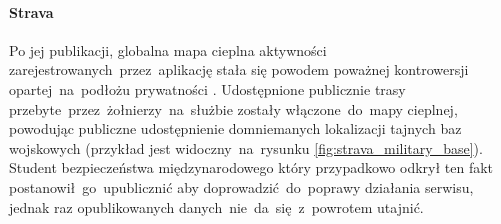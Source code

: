 \paragraph{Strava}
Po jej publikacji, globalna mapa cieplna aktywności zarejestrowanych~przez~aplikację  stała się powodem poważnej kontrowersji opartej~na~podłożu prywatności \cite{Strava_Military_Bases}. Udostępnione publicznie trasy przebyte~przez~żołnierzy~na~służbie zostały włączone~do~mapy cieplnej, powodując publiczne udostępnienie domniemanych lokalizacji tajnych baz wojskowych (przykład jest widoczny~na~rysunku \ref{fig:strava_military_base}). Student bezpieczeństwa międzynarodowego który przypadkowo odkrył ten fakt postanowił~go~upublicznić aby doprowadzić~do~poprawy działania serwisu, jednak raz opublikowanych danych~nie~da~się~z~powrotem utajnić.

\bigskip
{}


